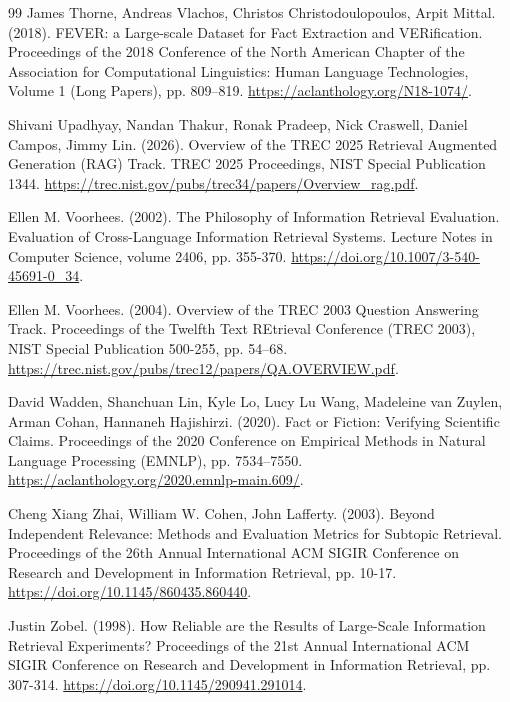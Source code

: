 \documentclass[twoside,a4paper,11pt]{article}
\begin{document}
\begin{thebibliography}{99}
James Thorne, Andreas Vlachos, Christos Christodoulopoulos, Arpit Mittal. (2018). FEVER: a Large-scale Dataset for Fact Extraction and VERification. Proceedings of the 2018 Conference of the North American Chapter of the Association for Computational Linguistics: Human Language Technologies, Volume 1 (Long Papers), pp. 809--819. \url{https://aclanthology.org/N18-1074/}.

Shivani Upadhyay, Nandan Thakur, Ronak Pradeep, Nick Craswell, Daniel Campos, Jimmy Lin. (2026). Overview of the TREC 2025 Retrieval Augmented Generation (RAG) Track. TREC 2025 Proceedings, NIST Special Publication 1344. \url{https://trec.nist.gov/pubs/trec34/papers/Overview_rag.pdf}.

Ellen M. Voorhees. (2002). The Philosophy of Information Retrieval Evaluation. Evaluation of Cross-Language Information Retrieval Systems. Lecture Notes in Computer Science, volume 2406, pp. 355-370. \url{https://doi.org/10.1007/3-540-45691-0_34}.

Ellen M. Voorhees. (2004). Overview of the TREC 2003 Question Answering Track. Proceedings of the Twelfth Text REtrieval Conference (TREC 2003), NIST Special Publication 500-255, pp. 54--68. \url{https://trec.nist.gov/pubs/trec12/papers/QA.OVERVIEW.pdf}.

David Wadden, Shanchuan Lin, Kyle Lo, Lucy Lu Wang, Madeleine van Zuylen, Arman Cohan, Hannaneh Hajishirzi. (2020). Fact or Fiction: Verifying Scientific Claims. Proceedings of the 2020 Conference on Empirical Methods in Natural Language Processing (EMNLP), pp. 7534--7550. \url{https://aclanthology.org/2020.emnlp-main.609/}.

Cheng Xiang Zhai, William W. Cohen, John Lafferty. (2003). Beyond Independent Relevance: Methods and Evaluation Metrics for Subtopic Retrieval. Proceedings of the 26th Annual International ACM SIGIR Conference on Research and Development in Information Retrieval, pp. 10-17. \url{https://doi.org/10.1145/860435.860440}.

Justin Zobel. (1998). How Reliable are the Results of Large-Scale Information Retrieval Experiments? Proceedings of the 21st Annual International ACM SIGIR Conference on Research and Development in Information Retrieval, pp. 307-314. \url{https://doi.org/10.1145/290941.291014}.

\end{thebibliography}
\end{document}
